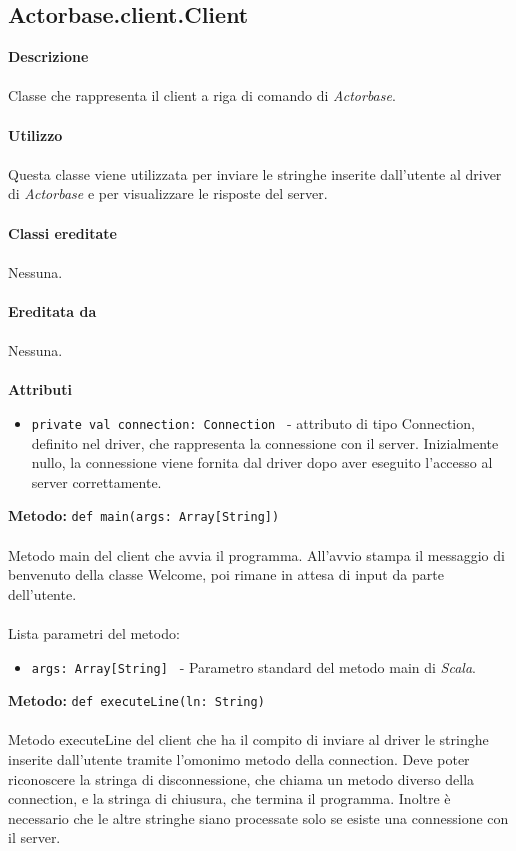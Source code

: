 \documentclass[a4paper]{article}
\begin{document}
	\subsection{Actorbase.client.Client}	
		\textbf{Descrizione}
			\\ \\
			Classe che rappresenta il client a riga di comando di \emph{Actorbase}.
			\\ \\
		\textbf{Utilizzo}
			\\ \\
			Questa classe viene utilizzata per inviare le stringhe inserite dall'utente al driver di \emph{Actorbase} e per visualizzare le risposte del server.
			\\ \\
		\textbf{Classi ereditate}
			\\ \\
			Nessuna.
			\\ \\
		\textbf{Ereditata da}
			\\ \\
			Nessuna.
			\\ \\
		\textbf{Attributi}
			\begin{itemize}
				\item \texttt{private val connection: Connection } - attributo di tipo Connection, definito nel driver, che rappresenta la connessione con il server. Inizialmente nullo, la connessione viene fornita dal driver dopo aver eseguito l'accesso al server correttamente.
			\end{itemize}
			\textbf{Metodo: }\texttt{def main(args: Array[String])}
			\\ \\
			Metodo main del client che avvia il programma. All'avvio stampa il messaggio di benvenuto della classe Welcome, poi rimane in attesa di input da parte dell'utente.
			\\ \\
			Lista parametri del metodo:
			\begin{itemize}
				\item \texttt{args: Array[String] } - Parametro standard del metodo main di \emph{Scala}.
			\end{itemize}
			\textbf{Metodo: }\texttt{def executeLine(ln: String)}
			\\ \\
			Metodo executeLine del client che ha il compito di inviare al driver le stringhe inserite dall'utente tramite l'omonimo metodo della connection. Deve poter riconoscere la stringa di disconnessione, che chiama un metodo diverso della connection, e la stringa di chiusura, che termina il programma. Inoltre è necessario che le altre stringhe siano processate solo se esiste una connessione con il server.
\end{document}
